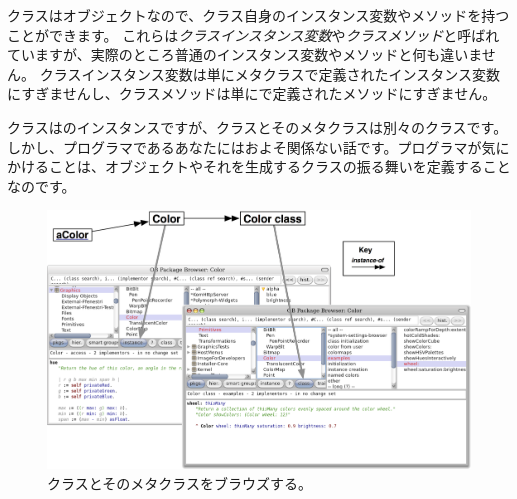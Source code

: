 \documentclass[a4paper,10pt,twoside]{book}
\begin{document}
クラスはオブジェクトなので、クラス自身のインスタンス変数やメソッドを持つことができます。
これらは\emph{クラスインスタンス変数}や\emph{クラスメソッド}と呼ばれていますが、実際のところ普通のインスタンス変数やメソッドと何も違いません。
クラスインスタンス変数は単にメタクラスで定義されたインスタンス変数にすぎませんし、クラスメソッドは単にで定義されたメソッドにすぎません。

クラスはのインスタンスですが、クラスとそのメタクラスは別々のクラスです。
しかし、プログラマであるあなたにはおよそ関係ない話です。プログラマが気にかけることは、オブジェクトやそれを生成するクラスの振る舞いを定義することなのです。

\begin{figure}[htb]
\begin{center}
\includegraphics[width=\textwidth]{Color-Buttons}
\caption{クラスとそのメタクラスをブラウズする。
}
\end{center}
\end{figure}
\end{document}
